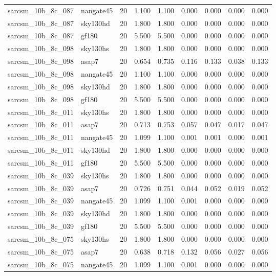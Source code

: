\begin{tabular}{llrrrrrrr}
sarcsm\_10b\_8c\_087 & nangate45 & 20 & 1.100 & 1.100 & 0.000 & 0.000 & 0.000 & 0.000 \\
sarcsm\_10b\_8c\_087 & sky130hd & 20 & 1.800 & 1.800 & 0.000 & 0.000 & 0.000 & 0.000 \\
sarcsm\_10b\_8c\_087 & gf180 & 20 & 5.500 & 5.500 & 0.000 & 0.000 & 0.000 & 0.000 \\
sarcsm\_10b\_8c\_098 & sky130hs & 20 & 1.800 & 1.800 & 0.000 & 0.000 & 0.000 & 0.000 \\
sarcsm\_10b\_8c\_098 & asap7 & 20 & 0.654 & 0.735 & 0.116 & 0.133 & 0.038 & 0.133 \\
sarcsm\_10b\_8c\_098 & nangate45 & 20 & 1.100 & 1.100 & 0.000 & 0.000 & 0.000 & 0.000 \\
sarcsm\_10b\_8c\_098 & sky130hd & 20 & 1.800 & 1.800 & 0.000 & 0.000 & 0.000 & 0.000 \\
sarcsm\_10b\_8c\_098 & gf180 & 20 & 5.500 & 5.500 & 0.000 & 0.000 & 0.000 & 0.000 \\
sarcsm\_10b\_8c\_011 & sky130hs & 20 & 1.800 & 1.800 & 0.000 & 0.000 & 0.000 & 0.000 \\
sarcsm\_10b\_8c\_011 & asap7 & 20 & 0.713 & 0.753 & 0.057 & 0.047 & 0.017 & 0.047 \\
sarcsm\_10b\_8c\_011 & nangate45 & 20 & 1.099 & 1.100 & 0.001 & 0.001 & 0.000 & 0.001 \\
sarcsm\_10b\_8c\_011 & sky130hd & 20 & 1.800 & 1.800 & 0.000 & 0.000 & 0.000 & 0.000 \\
sarcsm\_10b\_8c\_011 & gf180 & 20 & 5.500 & 5.500 & 0.000 & 0.000 & 0.000 & 0.000 \\
sarcsm\_10b\_8c\_039 & sky130hs & 20 & 1.800 & 1.800 & 0.000 & 0.000 & 0.000 & 0.000 \\
sarcsm\_10b\_8c\_039 & asap7 & 20 & 0.726 & 0.751 & 0.044 & 0.052 & 0.019 & 0.052 \\
sarcsm\_10b\_8c\_039 & nangate45 & 20 & 1.099 & 1.100 & 0.001 & 0.000 & 0.000 & 0.000 \\
sarcsm\_10b\_8c\_039 & sky130hd & 20 & 1.800 & 1.800 & 0.000 & 0.000 & 0.000 & 0.000 \\
sarcsm\_10b\_8c\_039 & gf180 & 20 & 5.500 & 5.500 & 0.000 & 0.000 & 0.000 & 0.000 \\
sarcsm\_10b\_8c\_075 & sky130hs & 20 & 1.800 & 1.800 & 0.000 & 0.000 & 0.000 & 0.000 \\
sarcsm\_10b\_8c\_075 & asap7 & 20 & 0.638 & 0.718 & 0.132 & 0.056 & 0.027 & 0.056 \\
sarcsm\_10b\_8c\_075 & nangate45 & 20 & 1.099 & 1.100 & 0.001 & 0.000 & 0.000 & 0.000 \\

\end{tabular}
